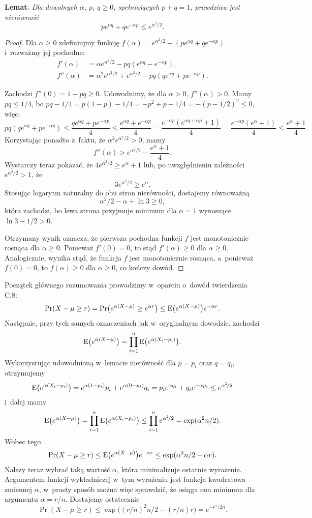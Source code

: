 \noindent\textsf{\textbf{Lemat.}} \textit{Dla dowolnych\/ $\alpha$,\/ $p$,\/ $q\ge0$, spełniających\/ $p+q=1$, prawdziwa jest nierówność}
	\[
		pe^{\alpha q}+qe^{-\alpha p} \le e^{\alpha^2\!/2}.
	\]
\begin{proof}
	Dla $\alpha\ge0$ zdefiniujmy funkcję $f(\alpha)=e^{\alpha^2\!/2}-(pe^{\alpha q}+qe^{-\alpha p})$ i~rozważmy jej pochodne:
	\begin{align*}
		f'(\alpha) &= \alpha e^{\alpha^2\!/2}-pq(e^{\alpha q}-e^{-\alpha p}), \\
		f''(\alpha) &= \alpha^2e^{\alpha^2\!/2}+e^{\alpha^2\!/2}-pq(qe^{\alpha q}+pe^{-\alpha p}).
	\end{align*}

	Zachodzi $f''(0)=1-pq\ge0$.
	Udowodnimy, że dla $\alpha>0$, $f''(\alpha)>0$.
	Mamy $pq\le1/4$, bo $pq-1/4=p(1-p)-1/4=-p^2+p-1/4=-(p-1/2)^2\le0$, więc:
	\[
		pq(qe^{\alpha q}+pe^{-\alpha p}) \le \frac{qe^{\alpha q}+pe^{-\alpha p}}{4} \le \frac{e^{\alpha q}+e^{-\alpha p}}{4} = \frac{e^{-\alpha p}(e^{\alpha q+\alpha p}+1)}{4} = \frac{e^{-\alpha p}(e^\alpha+1)}{4} \le \frac{e^\alpha+1}{4}.
	\]
	Korzystając ponadto z~faktu, że $\alpha^2e^{\alpha^2\!/2}>0$, mamy
	\[
		f''(\alpha) > e^{\alpha^2\!/2}-\frac{e^\alpha+1}{4}.
	\]
	Wystarczy teraz pokazać, że $4e^{\alpha^2\!/2}\ge e^\alpha+1$ lub, po uwzględnieniu zależności $e^{\alpha^2\!/2}>1$, że
	\[
		3e^{\alpha^2\!/2} \ge e^\alpha.
	\]
	Stosując logarytm naturalny do obu stron nierówności, dostajemy równoważną
	\[
		\alpha^2\!/2-\alpha+\ln3 \ge 0,
	\]
	która zachodzi, bo lewa strona przyjmuje minimum dla $\alpha=1$ wynoszące $\ln3-1/2>0$.

	Otrzymany wynik oznacza, że pierwsza pochodna funkcji $f$ jest monotonicznie rosnąca dla $\alpha\ge0$.
	Ponieważ $f'(0)=0$, to stąd $f'(\alpha)\ge0$ dla $\alpha\ge0$.
	Analogicznie, wynika stąd, że funkcja $f$ jest monotonicznie rosnąca, a~ponieważ $f(0)=0$, to $f(\alpha)\ge0$ dla $\alpha\ge0$, co kończy dowód.
\end{proof}

Początek głównego rozumowania prowadzimy w~oparciu o~dowód twierdzenia C.8:
\[
	\Pr(X-\mu\ge r) = \Pr\bigl(e^{\alpha(X-\mu)}\ge e^{\alpha r}\bigr) \le \operatorname{E}\bigl(e^{\alpha(X-\mu)}\bigr)e^{-\alpha r}.
\]
Następnie, przy tych samych oznaczeniach jak w~oryginalnym dowodzie, zachodzi
\[
	\operatorname{E}\bigl(e^{\alpha(X-\mu)}\bigr) = \prod_{i=1}^n\operatorname{E}\bigl(e^{\alpha(X_i-p_i)}\bigr).
\]
Wykorzystując udowodnioną w~lemacie nierówność dla $p=p_i$ oraz $q=q_i$, otrzymujemy
\[
	\operatorname{E}\bigl(e^{\alpha(X_i-p_i)}\bigr) = e^{\alpha(1-p_i)}p_i+e^{\alpha(0-p_i)}q_i = p_ie^{\alpha q_i}+q_ie^{-\alpha p_i} \le e^{\alpha^2\!/2}
\]
i~dalej mamy
\[
	\operatorname{E}\bigl(e^{\alpha(X-\mu)}\bigr) = \prod_{i=1}^n\operatorname{E}\bigl(e^{\alpha(X_i-p_i)}\bigr) \le \prod_{i=1}^ne^{\alpha^2\!/2} = \exp(\alpha^2n/2).
\]
Wobec tego
\[
	\Pr(X-\mu\ge r) \le \operatorname{E}\bigl(e^{\alpha(X-\mu)}\bigr)e^{-\alpha r} \le \exp(\alpha^2n/2-\alpha r).
\]
Należy teraz wybrać taką wartość $\alpha$, która minimalizuje ostatnie wyrażenie.
Argumentem funkcji wykładniczej w~tym wyrażeniu jest funkcja kwadratowa zmiennej $\alpha$, w~prosty sposób można więc sprawdzić, że osiąga ona minimum dla argumentu $\alpha=r/n$.
Dostajemy ostatecznie
\[
	\Pr(X-\mu\ge r) \le \exp\bigl((r/n)^2n/2-(r/n)r\bigr) = e^{-r^2\!/{2n}}.
\]

